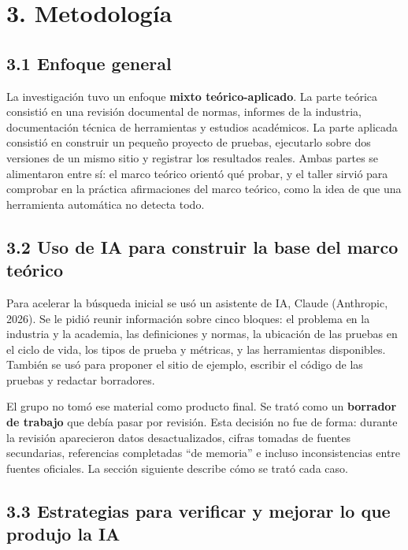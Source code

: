 \documentclass[10pt,letterpaper,onecolumn]{IEEEtran}
\begin{document}
\section{3. Metodología}\label{metodologuxeda}

\subsection{3.1 Enfoque general}\label{enfoque-general}

La investigación tuvo un enfoque \textbf{mixto teórico-aplicado}. La parte teórica consistió en una revisión documental de normas, informes de la industria, documentación técnica de herramientas y estudios académicos. La parte aplicada consistió en construir un pequeño proyecto de pruebas, ejecutarlo sobre dos versiones de un mismo sitio y registrar los resultados reales. Ambas partes se alimentaron entre sí: el marco teórico orientó qué probar, y el taller sirvió para comprobar en la práctica afirmaciones del marco teórico, como la idea de que una herramienta automática no detecta todo.

\subsection{3.2 Uso de IA para construir la base del marco teórico}\label{uso-de-ia-para-construir-la-base-del-marco-teuxf3rico}

Para acelerar la búsqueda inicial se usó un asistente de IA, Claude (Anthropic, 2026). Se le pidió reunir información sobre cinco bloques: el problema en la industria y la academia, las definiciones y normas, la ubicación de las pruebas en el ciclo de vida, los tipos de prueba y métricas, y las herramientas disponibles. También se usó para proponer el sitio de ejemplo, escribir el código de las pruebas y redactar borradores.

El grupo no tomó ese material como producto final. Se trató como un \textbf{borrador de trabajo} que debía pasar por revisión. Esta decisión no fue de forma: durante la revisión aparecieron datos desactualizados, cifras tomadas de fuentes secundarias, referencias completadas ``de memoria'' e incluso inconsistencias entre fuentes oficiales. La sección siguiente describe cómo se trató cada caso.

\subsection{3.3 Estrategias para verificar y mejorar lo que produjo la IA}\label{estrategias-para-verificar-y-mejorar-lo-que-produjo-la-ia}
\end{document}
